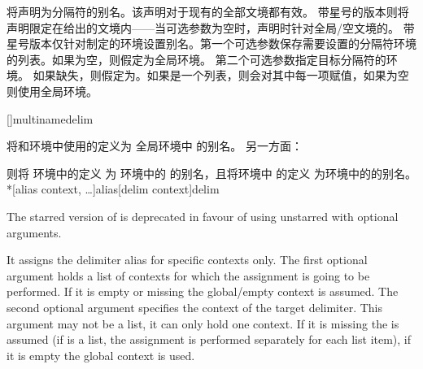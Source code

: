 \begin{ltxsyntax}
将声明为分隔符的别名。该声明对于现有的全部文境都有效。
带星号的版本则将声明限定在给出的文境内——当可选参数为空时，声明时针对全局/空文境的。
带星号版本仅针对制定的环境设置别名。第一个可选参数保存需要设置的分隔符环境的列表。如果为空，则假定为全局环境。
第二个可选参数指定目标分隔符的环境。
如果缺失，则假定为。如果是一个列表，则会对其中每一项赋值，如果为空则使用全局环境。



\begin{ltxexample}[style=latex]
[]{multinamedelim}
\end{ltxexample}
%

将和环境中使用的定义为
全局环境中 的别名。
另一方面：

\begin{ltxexample}[style=latex]
\end{ltxexample}
%

则将  环境中的定义
为 环境中的 的别名，且将环境中
的定义
为环境中的的别名。
*[alias context, \dots]{alias}[delim context]{delim}\DeprecatedMark

The starred version of  is deprecated in favour of using unstarred  with optional arguments.

It assigns the delimiter alias for specific contexts only. The first optional argument  holds a list of contexts for which the assignment is going to be performed. If it is empty or missing the global/empty context is assumed. The second optional argument  specifies the context of the target delimiter. This argument may not be a list, it can only hold one context. If it is missing the  is assumed (if  is a list, the assignment is performed separately for each list item), if it is empty the global context is used.


\end{ltxsyntax}
